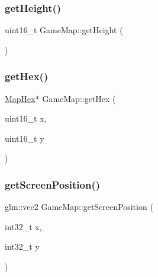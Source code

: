 \subsubsection{\texorpdfstring{get\+Height()}{getHeight()}}
{\footnotesize\ttfamily uint16\+\_\+t Game\+Map\+::get\+Height (\begin{DoxyParamCaption}{ }\end{DoxyParamCaption})\hspace{0.3cm}{\ttfamily [inline]}}

\mbox{\label{class_game_map_a984e563131ecca57fefae279be891952}} 
\subsubsection{\texorpdfstring{get\+Hex()}{getHex()}}
{\footnotesize\ttfamily \hyperlink{class_map_hex}{Map\+Hex}$\ast$ Game\+Map\+::get\+Hex (\begin{DoxyParamCaption}\item[{uint16\+\_\+t}]{x,  }\item[{uint16\+\_\+t}]{y }\end{DoxyParamCaption})\hspace{0.3cm}{\ttfamily [inline]}}

\mbox{\label{class_game_map_a0b997749d8585a6b4173a1d3f174949c}} 
\subsubsection{\texorpdfstring{get\+Screen\+Position()}{getScreenPosition()}}
{\footnotesize\ttfamily glm\+::vec2 Game\+Map\+::get\+Screen\+Position (\begin{DoxyParamCaption}\item[{int32\+\_\+t}]{x,  }\item[{int32\+\_\+t}]{y }\end{DoxyParamCaption})\hspace{0.3cm}{\ttfamily [private]}}

\mbox{\label{class_game_map_a2d2b30e705de99d03e5b479ca38b6d91}} 
